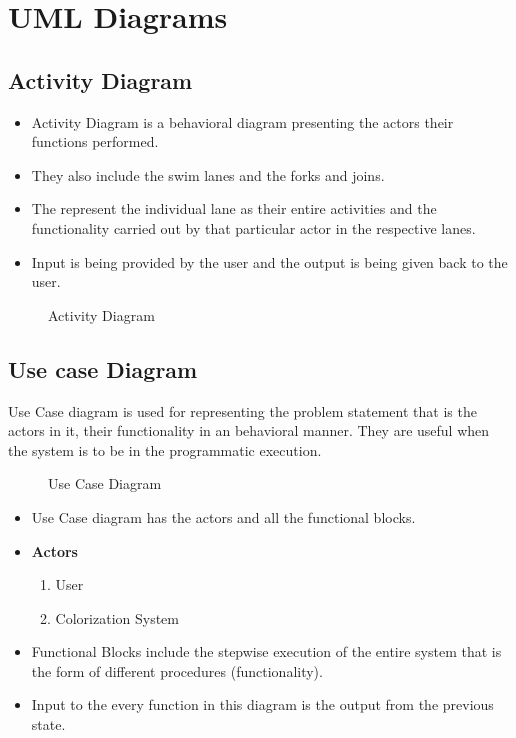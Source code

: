 \documentclass[12pt]{report}	%
\newcommand{\squeezeup}{\vspace{-0.6cm}}
\begin{document}
\section{UML Diagrams}
\subsection{Activity Diagram}
\begin{itemize}
	\item	Activity Diagram is a behavioral diagram presenting the actors their functions performed.
	\item	They also include the swim lanes and the forks and joins.
	\item	The represent the individual  lane as their entire activities and the functionality carried out by that particular actor in the respective lanes.
	\item	Input is being provided by the user and the output is being given back to the user.
	
\end{itemize}
\begin{figure}[!t]
	\captionsetup{font=scriptsize}
	\begin{center}
		{}
		\caption{Activity Diagram}
		\label{fig:5}
	\end{center}
	\squeezeup
\end{figure}
\newpage

\subsection{Use case Diagram}
Use Case diagram is used for representing the problem statement that is the actors in it, their functionality in an behavioral manner. They are useful when the system is to be in the programmatic execution.
\begin{figure}[!h]
	\captionsetup{font=scriptsize}
	\begin{center}
		{}
	\caption{Use Case Diagram}
		\label{fig:6}
	\end{center}
	\squeezeup
\end{figure}
\newpage
\begin{itemize}
	\item Use Case diagram has the actors and all the functional blocks.
	\item{\bf Actors}
	\begin{enumerate}
		\item User
		\item Colorization System
	\end{enumerate}
	\item Functional Blocks include the stepwise execution of the entire system that is the form of different procedures (functionality).
	\item	Input to the every function in this diagram is the output from the previous state.
	\newpage
\end{itemize}
\end{document}

